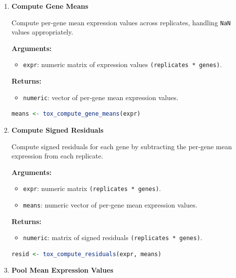 \begin{enumerate}
    \item \textbf{Compute Gene Means}

        Compute per‑gene mean expression values across replicates, handling \lstinline!NaN! values appropriately.

        \textbf{Arguments:}
        \begin{itemize}
            \item \lstinline!expr!: numeric matrix of expression values \lstinline!(replicates * genes)!.
        \end{itemize}

        \textbf{Returns:}
        \begin{itemize}
            \item \lstinline!numeric!: vector of per‑gene mean expression values.
        \end{itemize}

        \begin{lstlisting}[language=R, caption={Per‑Gene Mean Expression}]
means <- tox_compute_gene_means(expr)
        \end{lstlisting}

    \item \textbf{Compute Signed Residuals}

        Compute signed residuals for each gene by subtracting the per‑gene mean expression from each replicate.

        \textbf{Arguments:}
        \begin{itemize}
            \item \lstinline!expr!: numeric matrix \lstinline!(replicates * genes)!.
            \item \lstinline!means!: numeric vector of per‑gene mean expression values.
        \end{itemize}

        \textbf{Returns:}
        \begin{itemize}
            \item \lstinline!numeric!: matrix of signed residuals \lstinline!(replicates * genes)!.
        \end{itemize}

        \begin{lstlisting}[language=R, caption={Signed Residual Computation}]
resid <- tox_compute_residuals(expr, means)
        \end{lstlisting}

    \item \textbf{Pool Mean Expression Values}


\end{enumerate}
